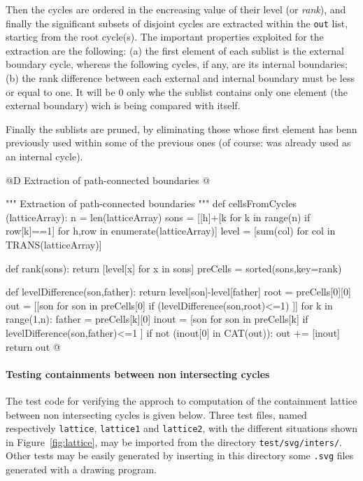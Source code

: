 \documentclass[11pt,oneside]{article}    %
\begin{document}
Then the cycles are ordered in the encreasing value of their level (or \emph{rank}), and finally the significant subsets of disjoint cycles are extracted within the \texttt{out} list, starticg from the root cycle(s). The important properties exploited for the extraction are the following: (a) the first element of each sublist is the external boundary cycle, whereas the following cycles, if any, are its internal boundaries; (b) the rank difference between each external and internal boundary must be less or equal to one. It will be 0 only whe the sublist contains only one element (the external boundary) wich is being compared with itself.

Finally the sublists are pruned, by eliminating those whose first element has benn previously used within some of the previous ones (of course: was already used as an internal cycle).

@D Extraction of path-connected boundaries
@{""" Extraction of path-connected boundaries """
def cellsFromCycles (latticeArray):
    n = len(latticeArray)
    sons = [[h]+[k for k in range(n) if row[k]==1] for h,row in enumerate(latticeArray)]
    level = [sum(col) for col in TRANS(latticeArray)]
    
    def rank(sons): return [level[x] for x in sons]
    preCells = sorted(sons,key=rank)

    def levelDifference(son,father): return level[son]-level[father]
    root = preCells[0][0]
    out = [[son for son in preCells[0] if (levelDifference(son,root)<=1) ]]
    for k in range(1,n):
        father = preCells[k][0]
        inout = [son for son in preCells[k] if levelDifference(son,father)<=1 ]
        if not (inout[0] in CAT(out)):
            out += [inout]
    return out        
@}

\paragraph{Testing containments between non intersecting cycles}

The test code for verifying the approch to computation of the containment lattice between non intersecting cycles is given below. Three test files, named respectively \texttt{lattice}, \texttt{lattice1} and \texttt{lattice2},  with the different situations shown in Figure~\ref{fig:lattice}, may be imported from the directory \texttt{test/svg/inters/}. Other tests may be easily generated by inserting in this directory some \texttt{.svg} files generated with a drawing program. 
\end{document}
